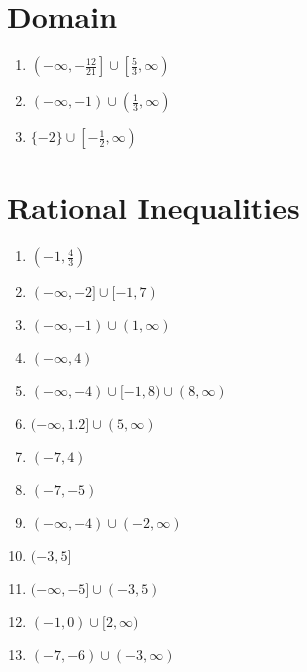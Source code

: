 \section*{Domain}
\begin{enumerate}
	\item $\left(-\infty, -\frac{12}{21}\right] \cup \left[\frac{5}{3}, \infty\right)$
	\item $(-\infty, -1) \cup \left(\frac{1}{3}, \infty\right)$
	\item $\{-2\} \cup \left[-\frac{1}{2}, \infty\right)$
\end{enumerate}

\section*{Rational Inequalities}
\begin{multicols}{2}
\begin{enumerate}
    \item $\left(-1, \frac{4}{3}\right)$
    \item $(-\infty,-2] \cup [-1, 7)$
    \item $(-\infty, -1) \cup (1, \infty)$
    \item $(-\infty, 4)$
    \item $(-\infty, -4) \cup [-1, 8) \cup (8, \infty)$
    \item $(-\infty, 1.2] \cup (5, \infty)$
    \item $(-7, 4)$
    \item $(-7, -5)$
    \item $(-\infty, -4) \cup (-2, \infty)$
    \item $(-3, 5]$
    \item $(-\infty, -5] \cup (-3, 5)$
    \item $(-1, 0) \cup [2, \infty)$
    \item $(-7, -6) \cup (-3, \infty)$
\end{enumerate}
\end{multicols}